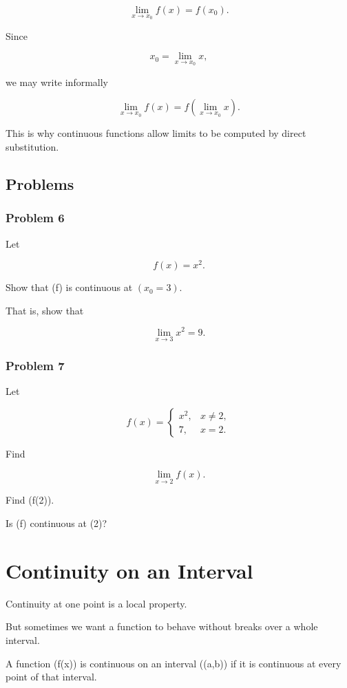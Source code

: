 \[
\lim_{x\to x_0}f(x)=f(x_0).
\]

Since

\[
x_0=\lim_{x\to x_0}x,
\]

we may write informally

\[
\lim_{x\to x_0}f(x) = f\left(\lim_{x\to x_0}x\right).
\]

This is why continuous functions allow limits to be computed by direct substitution.

\subsection{Problems}

\subsubsection*{Problem 6}

Let

\[
f(x)=x^2.
\]

Show that (f) is continuous at $(x_0=3)$.

That is, show that

\[
\lim_{x\to 3}x^2=9.
\]

\subsubsection*{Problem 7}

Let

\[
f(x)=
\begin{cases}
x^2, & x\neq 2,\\
7, & x=2.
\end{cases}
\]

Find

\[
\lim_{x\to 2}f(x).
\]

Find (f(2)).

Is (f) continuous at (2)?

\section{Continuity on an Interval}

Continuity at one point is a local property.

But sometimes we want a function to behave without breaks over a whole interval.

\begin{definition}
A function (f(x)) is continuous on an interval ((a,b)) if it is continuous at every point of that interval.
\end{definition}

